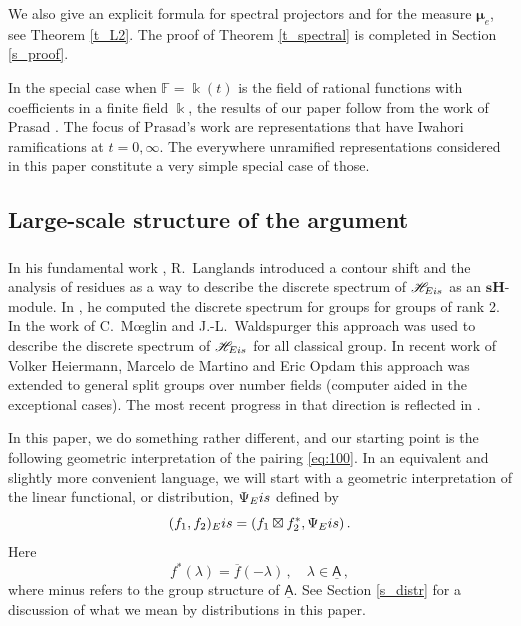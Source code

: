 \documentclass[14pt]{extarticle}
\newcommand{\F}{\mathbb{F}}
\newcommand{\bA}{\mathsf{A}}
\newcommand{\uA}{\underline{\bA}}
\newcommand{\sH}{\mathbf{sH}}
\newcommand{\bmu}{\boldsymbol{\mu}}
\newcommand{\cH}{\mathscr{H}}
\newcommand{\Eis}{\textup{Eis}}
\theoremstyle{definition}
\begin{document}
\noindent
We also give an explicit formula for spectral projectors and for the
measure $\bmu_e$, see Theorem \ref{t_L2}. The proof of Theorem \ref{t_spectral}  is
completed in Section \ref{s_proof}.

In the special case when $\F =\Bbbk(t)$ is the field of rational functions
with coefficients in a finite field $\Bbbk$,
the results of our paper follow from the work of Prasad
\cite{Prasad}. The focus of Prasad's work are representations that
have Iwahori ramifications at $t=0,\infty$. The everywhere unramified
representations considered in this paper constitute a very simple special
case of those. 



\subsection{Large-scale structure of the argument}




\subsubsection{}

In his fundamental work \cite{L}, R.~Langlands introduced a contour
shift and the analysis of residues as a way to describe the discrete
spectrum of $\cH _{\Eis}$ as an $\sH$-module. In \cite{L}, he
computed the discrete spectrum for groups for groups of rank 2.
In the work \cites{Moe1,Moe2} of C.~M\oe glin and J.-L.~Waldspurger this approach
was used to describe the discrete  spectrum of $\cH _{\Eis}$ for all 
classical group. In recent work  of Volker Heiermann, Marcelo de Martino and Eric Opdam \cite{DHO} 
this approach was extended to general split groups over number fields (computer 
aided in the exceptional cases). The most recent progress in that
direction is reflected in \cite{DHO2}. 



In this paper, we do something rather different, and our starting point
is the following geometric interpretation of the pairing 
\eqref{eq:100}. In an equivalent and slightly more convenient
language, we will start with a geometric interpretation of 
the linear functional, or distribution,  $\Psi_\Eis$
defined by 
%
\begin{equation}
  \label{eq:81}
   (f_1,f_2)_\Eis = (f_1 \boxtimes f_2^*, 
   \Psi_\Eis)  \,. 
\end{equation}
%
Here
\[
  f^* (\lambda) = \overline{f} (-\lambda) \,, \quad \lambda\in \uA
\,,
\]
where minus refers to the group structure of $\uA$. See Section
\ref{s_distr} for a discussion of what we mean by distributions in
this paper. 
\end{document}
